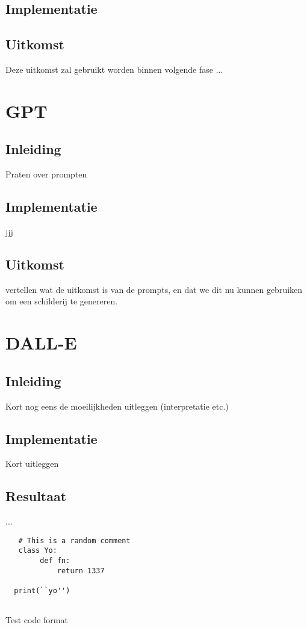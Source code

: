 \subsection{Implementatie}

\subsection{Uitkomst}
Deze uitkomst zal gebruikt worden binnen volgende fase ...  \\

\section{GPT}
\subsection{Inleiding}
Praten over prompten
\subsection{Implementatie}
jjj
\subsection{Uitkomst}
vertellen wat de uitkomst is van de prompts, en dat we dit nu kunnen gebruiken om een schilderij te genereren.

\section{DALL-E}
\subsection{Inleiding}
Kort nog eens de moeilijkheden uitleggen (interpretatie etc.)
\subsection{Implementatie}
Kort uitleggen
\subsection{Resultaat}
...
\begin{listing}[H]
\begin{verbatim}
   # This is a random comment
   class Yo:
        def fn:
            return 1337
   
  print(``yo'')
  
\end{verbatim}
\caption{Test code format}
\end{listing}